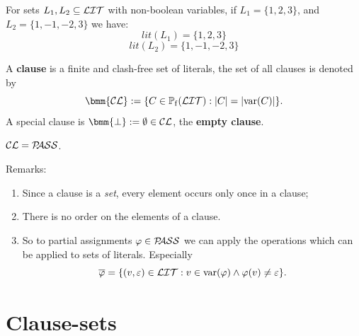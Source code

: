 \documentclass[]{book}
\begin{document}
\begin{examp}\label{exp:lit1}
      For sets $L_1, L_2 \subseteq \mathcal{LIT}$ with non-boolean variables, if $L_1 = \{1, 2, 3 \}$, and $L_2 = \{1, -1, -2, 3 \}$ we have:
      $$lit(L_1) = \{1, 2, 3\}$$
      $$lit(L_2) = \{1, -1, -2, 3\}$$
\end{examp}
\begin{defi}\label{def:cl}
      A \textbf{clause} is a finite and clash-free set of literals, the set of all clauses is denoted by
      $$\bmm{\Cl} := \set{C \in \pote(\Lit) : \abs{C} = \abs{\var(C)}}.$$
      A special clause is $\bmm{\bot} := \es \in \Cl$, the \textbf{empty clause}.
\end{defi}
\begin{lem}\label{lem::CLPASS}
      $\mathcal{CL} = \mathcal{P\hspace{-0.32em}ASS}$.
\end{lem}
Remarks:
\begin{enumerate}
      \item Since a clause is a \textit{set}, every element occurs only once in a clause;
      \item There is no order on the elements of a clause.
      \item So to partial assignments $\varphi \in \mathcal{P\hspace{-0.32em}ASS}$ we can apply the operations which can be applied to sets of literals. Especially
      $$\overline{\varphi} = \{ (v,\varepsilon) \in \mathcal{LIT} : v \in \operatorname{var}(\varphi) \wedge \varphi(v) \ne \varepsilon \}.$$
\end{enumerate}
\section{Clause-sets}
\label{sec:cls}
\end{document}

